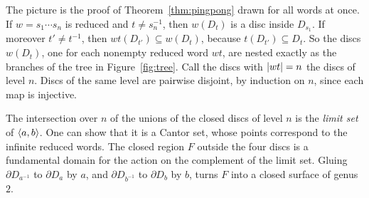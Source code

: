 The picture is the proof of Theorem~\ref{thm:pingpong} drawn for all words
at once. If
$w = s_1 \cdots s_n$ is reduced and $t \ne s_n^{-1}$, then $w(D_t)$ is a disc
inside $D_{s_1}$. If moreover $t' \ne t^{-1}$, then
$wt(D_{t'}) \subseteq w(D_t)$, because $t(D_{t'}) \subseteq D_t$. So the discs
$w(D_t)$, one for each nonempty reduced word $wt$, are nested exactly as the
branches of the tree in Figure~\ref{fig:tree}. Call the discs with
$\left|wt\right| = n$ the discs of level $n$. Discs of the same level are pairwise
disjoint, by induction on $n$, since each map is injective.

The intersection over $n$ of the unions of the closed discs of level $n$ is
the \emph{limit set} of $\langle a,b \rangle$. One can show that it is a Cantor set,
whose points correspond to the infinite reduced words. The closed region $F$
outside the four discs is a fundamental domain for the action on the
complement of the limit set. Gluing $\partial D_{a^{-1}}$ to $\partial D_a$
by $a$, and $\partial D_{b^{-1}}$ to $\partial D_b$ by $b$, turns $F$ into a
closed surface of genus~$2$.
